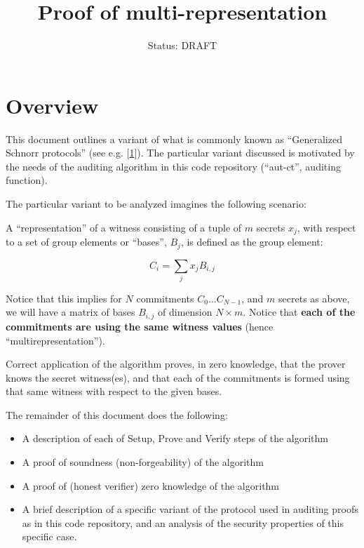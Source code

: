 \documentclass[10pt,a4paper]{article}
\author{Status: DRAFT}
\begin{document}
\title{Proof of multi-representation}
\maketitle


\section{Overview}

 This document outlines a variant of what is commonly known as ``Generalized Schnorr protocols'' (see e.g. {[}\protect\hyperlink{anchor-1}{1}{]}). The particular variant discussed is motivated by the needs of the auditing algorithm in this code repository (``aut-ct'', auditing function).

\vspace{5 pt}

 The particular variant to be analyzed imagines the following scenario:

\vspace{5 pt}

 A ``representation'' of a witness consisting of a tuple of $m$ secrets $x_j$, with respect to a set of group elements or ``bases'', $B_j$, is defined as the group element:

$$ C_i = \sum_j x_j B_{i,j}$$

 Notice that this implies for $N$ commitments $C_0 \ldots C_{N-1}$, and $m$ secrets as above, we will have a matrix of bases $B_{i,j}$ of dimension $N \times m$. Notice that \textbf{each of the commitments are using the same witness values} (hence ``multirepresentation'').

\vspace{5 pt}

Correct application of the algorithm proves, in zero knowledge, that the prover knows the secret witness(es), and that each of the commitments is formed using that same witness with respect to the given bases.

\vspace{5 pt}

The remainder of this document does the following:

\begin{itemize}
\item A description of each of Setup, Prove and Verify steps of the algorithm
\item A proof of soundness (non-forgeability) of the algorithm
\item A proof of (honest verifier) zero knowledge of the algorithm
\item A brief description of a specific variant of the protocol used in auditing proofs as in this code repository, and an analysis of the security properties of this specific case.
\end{itemize}
\end{document}
